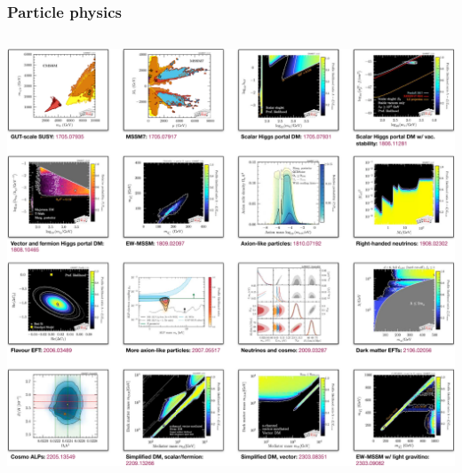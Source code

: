 \documentclass[aspectratio=169]{beamer}
\begin{document}
\begin{frame}
    \frametitle{Particle physics}
    \begin{columns}
        
        
        \includegraphics[width=\textwidth]{figures/gambit_examples}
    \end{columns}
    
\end{frame}
\end{document}
